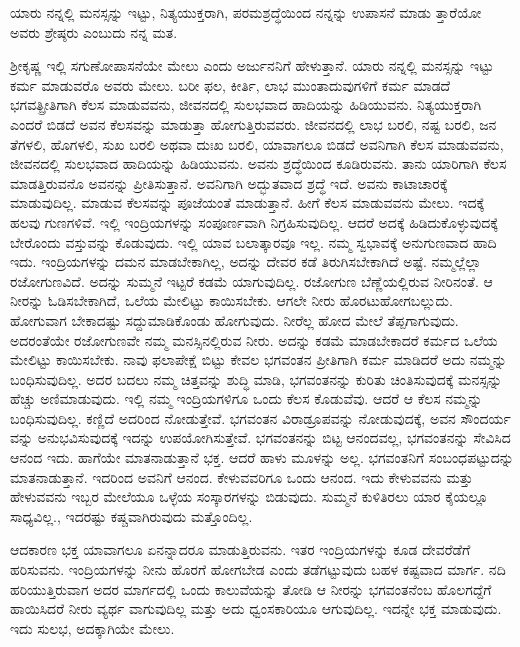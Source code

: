 {\small ಯಾರು ನನ್ನಲ್ಲಿ ಮನಸ್ಸನ್ನು ಇಟ್ಟು, ನಿತ್ಯಯುಕ್ತರಾಗಿ, ಪರಮಶ್ರದ್ಧೆಯಿಂದ ನನ್ನನ್ನು ಉಪಾಸನೆ ಮಾಡು ತ್ತಾರೆಯೋ ಅವರು ಶ್ರೇಷ್ಠರು ಎಂಬುದು ನನ್ನ ಮತ.}

ಶ‍್ರೀಕೃಷ್ಣ ಇಲ್ಲಿ ಸಗುಣೋಪಾಸನೆಯೇ ಮೇಲು ಎಂದು ಅರ್ಜುನನಿಗೆ ಹೇಳುತ್ತಾನೆ. ಯಾರು ನನ್ನಲ್ಲಿ ಮನಸ್ಸನ್ನು ಇಟ್ಟು ಕರ್ಮ ಮಾಡುವರೊ ಅವರು ಮೇಲು. ಬರೀ ಫಲ, ಕೀರ್ತಿ, ಲಾಭ ಮುಂತಾದುವುಗಳಿಗೆ ಕರ್ಮ ಮಾಡದೆ ಭಗವತ್ಪ್ರೀತಿಗಾಗಿ ಕೆಲಸ ಮಾಡುವವನು, ಜೀವನದಲ್ಲಿ ಸುಲಭವಾದ ಹಾದಿಯನ್ನು ಹಿಡಿಯುವನು. ನಿತ್ಯಯುಕ್ತರಾಗಿ ಎಂದರೆ ಬಿಡದೆ ಅವನ ಕೆಲಸವನ್ನು ಮಾಡುತ್ತಾ ಹೋಗುತ್ತಿರುವವರು. ಜೀವನದಲ್ಲಿ ಲಾಭ ಬರಲಿ, ನಷ್ಟ ಬರಲಿ, ಜನ ತೆಗಳಲಿ, ಹೊಗಳಲಿ, ಸುಖ ಬರಲಿ ಅಥವಾ ದುಃಖ ಬರಲಿ, ಯಾವಾಗಲೂ ಬಿಡದೆ ಅವನಿಗಾಗಿ ಕೆಲಸ ಮಾಡುವವನು, ಜೀವನದಲ್ಲಿ ಸುಲಭವಾದ ಹಾದಿಯನ್ನು ಹಿಡಿಯುವನು. ಅವನು ಶ್ರದ್ಧೆಯಿಂದ ಕೂಡಿರುವನು. ತಾನು ಯಾರಿಗಾಗಿ ಕೆಲಸ ಮಾಡತ್ತಿರುವನೊ ಅವನನ್ನು ಪ್ರೀತಿಸುತ್ತಾನೆ. ಅವನಿಗಾಗಿ ಅದ್ಭುತವಾದ ಶ್ರದ್ಧೆ ಇದೆ. ಅವನು ಕಾಟಾಚಾರಕ್ಕೆ ಮಾಡುವುದಿಲ್ಲ. ಮಾಡುವ ಕೆಲಸವನ್ನು ಪೂಜೆಯಂತೆ ಮಾಡುತ್ತಾನೆ. ಹೀಗೆ ಕೆಲಸ ಮಾಡುವವನು ಮೇಲು. ಇದಕ್ಕೆ ಹಲವು ಗುಣಗಳಿವೆ. ಇಲ್ಲಿ ಇಂದ್ರಿಯಗಳನ್ನು ಸಂಪೂರ್ಣವಾಗಿ ನಿಗ್ರಹಿಸುವುದಿಲ್ಲ. ಆದರೆ ಅದಕ್ಕೆ ಹಿಡಿದುಕೊಳ್ಳುವುದಕ್ಕೆ ಬೇರೊಂದು ವಸ್ತುವನ್ನು ಕೊಡುವುದು. ಇಲ್ಲಿ ಯಾವ ಬಲಾತ್ಕಾರವೂ ಇಲ್ಲ. ನಮ್ಮ ಸ್ವಭಾವಕ್ಕೆ ಅನುಗುಣವಾದ ಹಾದಿ ಇದು. ಇಂದ್ರಿಯಗಳನ್ನು ದಮನ ಮಾಡಬೇಕಾಗಿಲ್ಲ, ಅದನ್ನು ದೇವರ ಕಡೆ ತಿರುಗಿಸಬೇಕಾಗಿದೆ ಅಷ್ಟೆ. ನಮ್ಮಲ್ಲೆಲ್ಲಾ ರಜೋಗುಣವಿದೆ. ಅದನ್ನು ಸುಮ್ಮನೆ ಇಟ್ಟರೆ ಕಡಮೆ ಯಾಗುವುದಿಲ್ಲ. ರಜೋಗುಣ ಬೆಣ್ಣೆಯಲ್ಲಿರುವ ನೀರಿನಂತೆ. ಆ ನೀರನ್ನು ಓಡಿಸಬೇಕಾಗಿದೆ, ಒಲೆಯ ಮೇಲಿಟ್ಟು ಕಾಯಿಸಬೇಕು. ಆಗಲೇ ನೀರು ಹೊರಟುಹೋಗಬಲ್ಲುದು. ಹೋಗುವಾಗ ಬೇಕಾದಷ್ಟು ಸದ್ದುಮಾಡಿಕೊಂಡು ಹೋಗುವುದು. ನೀರೆಲ್ಲ ಹೋದ ಮೇಲೆ ತೆಪ್ಪಗಾಗುವುದು. ಅದರಂತೆಯೇ ರಜೋಗುಣವೇ ನಮ್ಮ ಮನಸ್ಸಿನಲ್ಲಿರುವ ನೀರು. ಅದನ್ನು ಕಡಮೆ ಮಾಡಬೇಕಾದರೆ ಕರ್ಮದ ಒಲೆಯ ಮೇಲಿಟ್ಟು ಕಾಯಿಸಬೇಕು. ನಾವು ಫಲಾಪೇಕ್ಷೆ ಬಿಟ್ಟು ಕೇವಲ ಭಗವಂತನ ಪ್ರೀತಿಗಾಗಿ ಕರ್ಮ ಮಾಡಿದರೆ ಅದು ನಮ್ಮನ್ನು ಬಂಧಿಸುವುದಿಲ್ಲ. ಅದರ ಬದಲು ನಮ್ಮ ಚಿತ್ತವನ್ನು ಶುದ್ಧಿ ಮಾಡಿ, ಭಗವಂತನನ್ನು ಕುರಿತು ಚಿಂತಿಸುವುದಕ್ಕೆ ಮನಸ್ಸನ್ನು ಹೆಚ್ಚು ಅಣಿಮಾಡುವುದು. ಇಲ್ಲಿ ನಮ್ಮ ಇಂದ್ರಿಯಗಳಿಗೂ ಒಂದು ಕೆಲಸ ಕೊಡುವೆವು. ಆದರೆ ಆ ಕೆಲಸ ನಮ್ಮನ್ನು ಬಂಧಿಸುವುದಿಲ್ಲ. ಕಣ್ಣಿದೆ ಅದರಿಂದ ನೋಡುತ್ತೇವೆ. ಭಗವಂತನ ವಿರಾಡ್ರೂಪವನ್ನು ನೋಡುವುದಕ್ಕೆ, ಅವನ ಸೌಂದರ್ಯ ವನ್ನು ಅನುಭವಿಸುವುದಕ್ಕೆ ಇದನ್ನು ಉಪಯೋಗಿಸುತ್ತೇವೆ. ಭಗವಂತನನ್ನು ಬಿಟ್ಟ ಆನಂದವಲ್ಲ, ಭಗವಂತನನ್ನು ಸೇವಿಸಿದ ಆನಂದ ಇದು. ಹಾಗೆಯೇ ಮಾತನಾಡುತ್ತಾನೆ ಭಕ್ತ. ಆದರೆ ಹಾಳು ಮೂಳನ್ನು ಅಲ್ಲ. ಭಗವಂತನಿಗೆ ಸಂಬಂಧಪಟ್ಟುದನ್ನು ಮಾತನಾಡುತ್ತಾನೆ. ಇದರಿಂದ ಅವನಿಗೆ ಆನಂದ. ಕೇಳುವವರಿಗೂ ಒಂದು ಆನಂದ. ಇದು ಕೇಳುವವನು ಮತ್ತು ಹೇಳುವವನು ಇಬ್ಬರ ಮೇಲೆಯೂ ಒಳ್ಳೆಯ ಸಂಸ್ಕಾರಗಳನ್ನು ಬಿಡುವುದು. ಸುಮ್ಮನೆ ಕುಳಿತಿರಲು ಯಾರ ಕೈಯಲ್ಲೂ ಸಾಧ್ಯವಿಲ್ಲ., ಇದರಷ್ಟು ಕಷ್ಚವಾಗಿರುವುದು ಮತ್ತೊಂದಿಲ್ಲ.

ಆದಕಾರಣ ಭಕ್ತ ಯಾವಾಗಲೂ ಏನನ್ನಾದರೂ ಮಾಡುತ್ತಿರುವನು. ಇತರ ಇಂದ್ರಿಯಗಳನ್ನು ಕೂಡ ದೇವರೆಡೆಗೆ ಹರಿಸುವನು. ಇಂದ್ರಿಯಗಳನ್ನು ನೀನು ಹೊರಗೆ ಹೋಗಬೇಡ ಎಂದು ತಡೆಗಟ್ಟುವುದು ಬಹಳ ಕಷ್ಟವಾದ ಮಾರ್ಗ. ನದಿ ಹರಿಯುತ್ತಿರುವಾಗ ಅದರ ಮಾರ್ಗದಲ್ಲಿ ಒಂದು ಕಾಲುವೆಯನ್ನು ತೋಡಿ ಆ ನೀರನ್ನು ಭಗವಂತನೆಂಬ ಹೊಲಗದ್ದೆಗೆ ಹಾಯಿಸಿದರೆ ನೀರು ವ್ಯರ್ಥ ವಾಗುವುದಿಲ್ಲ ಮತ್ತು ಅದು ಧ್ವಂಸಕಾರಿಯೂ ಆಗುವುದಿಲ್ಲ. ಇದನ್ನೇ ಭಕ್ತ ಮಾಡುವುದು. ಇದು ಸುಲಭ, ಅದಕ್ಕಾಗಿಯೇ ಮೇಲು.

